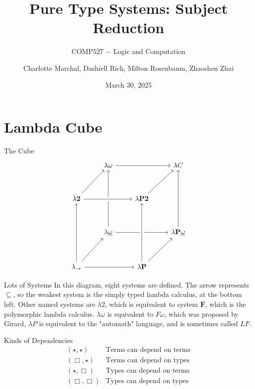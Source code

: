 \documentclass{beamer}
\title{\normalsize{Pure Type Systems: Subject Reduction}\vspace{0.05in}}
\author{\small Charlotte Marchal, Dashiell Rich, Milton Rosenbaum, Zhaoshen Zhai}
\subtitle{\scriptsize{COMP527 $-$ Logic and Computation}}
\date{\footnotesize March 30, 2025}
\begin{document}
\frame{\titlepage}
    \section{Lambda Cube}

    \begin{frame}{The Cube}
        \[\begin{tikzcd}[ampersand replacement=\&, row sep=3.4em]
            \& \lambda\omega \arrow[rr] \arrow[from=dd] \&\& \lambda C \\
            \lambda \textbf{2} \arrow[ur] \arrow[rr, crossing over] \&\& \lambda \textbf{P2} \arrow[ur] \& \\
            \& \lambda\underline{\omega} \arrow[rr] \&\& \lambda\textbf{P} \underline{\omega} \arrow[uu] \\
            \lambda_\rightarrow \arrow[uu] \arrow[rr] \arrow[ur] \&\& \lambda \textbf{P} \arrow[ur] \arrow[uu, crossing over]
        \end{tikzcd}\]
    \end{frame}

    \begin{frame}{Lots of Systems}
        In this diagram, eight systems are defined. The arrow represents $\subseteq$, so the weakest system is the simply typed lambda calculus, at the bottom left. Other named systems are $\lambda 2$, which is equivalent to system $\textbf{F}$, which is the polymorphic lambda calculus. $\lambda\omega$ is equivalent to $F\omega$, which was proposed by Girard, $\lambda P$ is equivalent to the "automath" language, and is sometimes called $LF$.
    \end{frame}

    \begin{frame}{Kinds of Dependencies}
        \[\begin{array}{c|l}
            (\star, \star) & \text{Terms can depend on terms} \\
            (\Box, \star) & \text{Terms can depend on types} \\
            (\star, \Box) & \text{Types can depend on terms} \\
            (\Box, \Box) & \text{Types can depend on types} \\
        \end{array}\]
    \end{frame}
\end{document}
